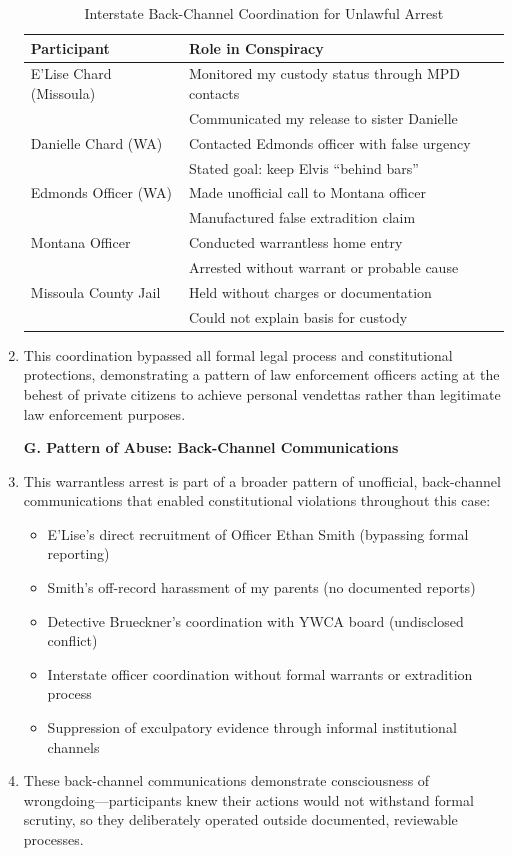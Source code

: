 \documentclass[12pt,letterpaper]{article}
\begin{document}
\begin{enumerate}
\begin{table}[h]
\begin{tabular}{|l|l|}
\hline
\textbf{Participant} & \textbf{Role in Conspiracy} \\
\hline
E'Lise Chard (Missoula) & Monitored my custody status through MPD contacts \\
& Communicated my release to sister Danielle \\
\hline
Danielle Chard (WA) & Contacted Edmonds officer with false urgency \\
& Stated goal: keep Elvis ``behind bars'' \\
\hline
Edmonds Officer (WA) & Made unofficial call to Montana officer \\
& Manufactured false extradition claim \\
\hline
Montana Officer & Conducted warrantless home entry \\
& Arrested without warrant or probable cause \\
\hline
Missoula County Jail & Held without charges or documentation \\
& Could not explain basis for custody \\
\hline
\end{tabular}
\caption{Interstate Back-Channel Coordination for Unlawful Arrest}
\end{table}

\item This coordination bypassed all formal legal process and constitutional protections, demonstrating a pattern of law enforcement officers acting at the behest of private citizens to achieve personal vendettas rather than legitimate law enforcement purposes.

\textbf{G. Pattern of Abuse: Back-Channel Communications}

\item This warrantless arrest is part of a broader pattern of unofficial, back-channel communications that enabled constitutional violations throughout this case:

\begin{itemize}
\item E'Lise's direct recruitment of Officer Ethan Smith (bypassing formal reporting)
\item Smith's off-record harassment of my parents (no documented reports)
\item Detective Brueckner's coordination with YWCA board (undisclosed conflict)
\item Interstate officer coordination without formal warrants or extradition process
\item Suppression of exculpatory evidence through informal institutional channels
\end{itemize}

\item These back-channel communications demonstrate consciousness of wrongdoing---participants knew their actions would not withstand formal scrutiny, so they deliberately operated outside documented, reviewable processes.

\end{enumerate}
\end{document}
